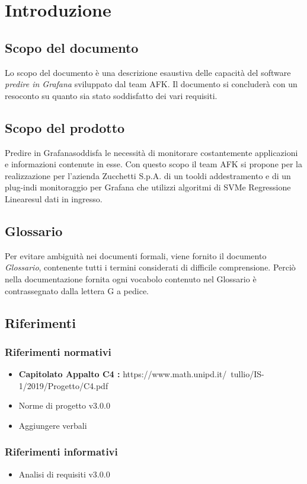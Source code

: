 \section{Introduzione}

\subsection{Scopo del documento}
Lo scopo del documento è una descrizione esaustiva delle capacità del software \textit{predire in Grafana} sviluppato dal team AFK.
Il documento si concluderà con un resoconto su quanto sia stato soddisfatto dei vari requisiti.

\subsection{Scopo del prodotto}
Predire in Grafana\glo soddisfa le necessità di monitorare costantemente applicazioni e informazioni contenute in esse. 
Con questo scopo il team AFK si propone per la realizzazione per l’azienda Zucchetti S.p.A. di un tool\glo di addestramento e di un plug-in\glo di monitoraggio per Grafana che utilizzi algoritmi di SVM\glo e Regressione Lineare\glo sul dati in ingresso.


\subsection{Glossario}
Per evitare ambiguità nei documenti formali, viene fornito il documento \textit{Glossario}, contenente tutti i termini considerati di difficile comprensione. Perciò nella documentazione fornita ogni vocabolo contenuto nel Glossario è contrassegnato dalla lettera G a pedice.

\subsection{Riferimenti}

\subsubsection{Riferimenti normativi}
\begin{itemize}
	\item
	\textbf{Capitolato Appalto C4 :} https://www.math.unipd.it/~tullio/IS-1/2019/Progetto/C4.pdf
	\item 
	Norme di progetto v3.0.0
	\item
	Aggiungere verbali
\end{itemize}

\subsubsection{Riferimenti informativi}
\begin{itemize}
	\item 
	Analisi di requisiti v3.0.0
\end{itemize}